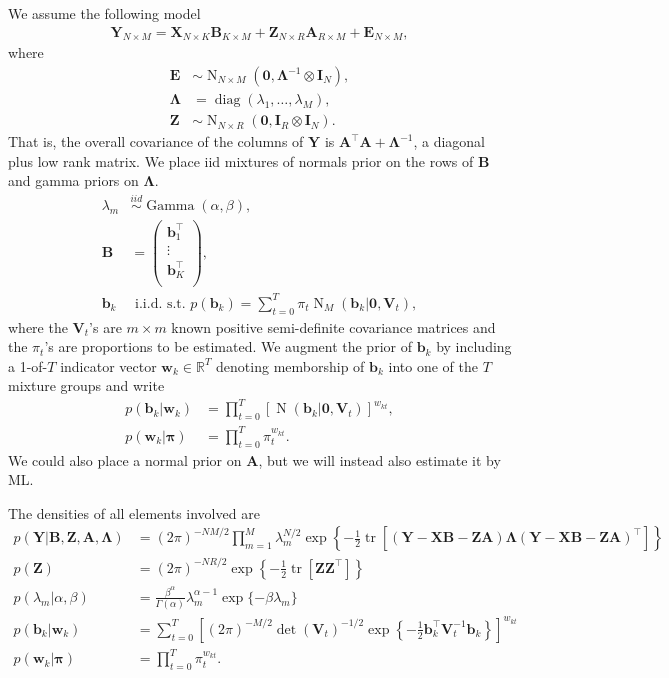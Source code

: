 \documentclass[11pt,authoryear]{article}
\DeclareMathOperator*{\diag}{diag}
\DeclareMathOperator*{\tr}{tr}
\DeclareMathOperator*{\N}{N}
\DeclareMathOperator*{\gm}{Gamma}
\newcommand{\bs}[1]{\boldsymbol{#1}}
\begin{document}
We assume the following model
\begin{align}
\bs{Y}_{N\times M} = \bs{X}_{N \times K}\bs{B}_{K \times M} + \bs{Z}_{N \times R}\bs{A}_{R \times M} + \bs{E}_{N \times M},
\end{align}
where
\begin{align}
\bs{E} &\sim \N_{N \times M}(\bs{0}, \bs{\Lambda}^{-1} \otimes \bs{I}_N),\\
\bs{\Lambda} &= \diag(\lambda_1,\ldots,\lambda_M),\\
\bs{Z} &\sim \N_{N\times R}(\bs{0}, \bs{I}_R \otimes \bs{I}_N).
\end{align}
That is, the overall covariance of the columns of $\bs{Y}$ is
$\bs{A}^{\intercal} \bs{A} + \bs{\Lambda}^{-1}$, a diagonal plus low
rank matrix. We place iid mixtures of normals prior on the rows of
$\bs{B}$ and gamma priors on $\bs{\Lambda}$.
\begin{align}
\lambda_m &\overset{iid}{\sim} \gm(\alpha, \beta),\\
\bs{B} &=
\left(
\begin{array}{c}
\bs{b}_1^\intercal\\
\vdots\\
\bs{b}_K^\intercal\\
\end{array}
\right),\\
\bs{b}_k &\text{ i.i.d. s.t. } p(\bs{b}_k) = \sum_{t = 0}^T\pi_t\N_M(\bs{b}_k | \bs{0}, \bs{V}_t),
\end{align}
where the $\bs{V}_t$'s are $m \times m$ known positive semi-definite
covariance matrices and the $\pi_t$'s are proportions to be
estimated. We augment the prior of $\bs{b}_k$ by including a 1-of-$T$
indicator vector $\bs{w}_k \in \mathbb{R}^{T}$ denoting memborship of
$\bs{b}_k$ into one of the $T$ mixture groups and write
\begin{align}
p(\bs{b}_k|\bs{w}_k) &= \prod_{t = 0}^T\left[\N(\bs{b}_k|\bs{0},\bs{V}_t)\right]^{w_{kt}},\\
p(\bs{w}_k|\bs{\pi}) &= \prod_{t = 0}^T \pi_t^{w_{kt}}.
\end{align}
We could also place a normal prior on $\bs{A}$, but we
will instead also estimate it by ML.

The densities of all elements involved are
\begin{align}
\label{equation:Y.conditional}p(\bs{Y}|\bs{B}, \bs{Z}, \bs{A}, \bs{\Lambda}) &= (2\pi)^{-NM/2} \prod_{m = 1}^M \lambda_m^{N/2} \exp\left\{-\frac{1}{2}\tr\left[(\bs{Y}-\bs{X}\bs{B}-\bs{Z}\bs{A})\bs{\Lambda}(\bs{Y}-\bs{X}\bs{B} - \bs{Z}\bs{A})^{\intercal}\right]\right\}\\
p(\bs{Z}) &= (2\pi)^{-NR/2}\exp\left\{-\frac{1}{2}\tr[\bs{Z}\bs{Z}^{\intercal}]\right\}  \\
p(\lambda_m|\alpha,\beta) &= \frac{\beta^{\alpha}}{\Gamma(\alpha)}\lambda_m^{\alpha - 1}\exp\{-\beta\lambda_m\}\\
p(\bs{b}_k|\bs{w}_k) &= \sum_{t = 0}^{T}\left[(2\pi)^{-M/2}\det(\bs{V}_t)^{-1/2}\exp\left\{-\frac{1}{2}\bs{b}_k^{\intercal}\bs{V}_t^{-1}\bs{b}_k\right\}\right]^{w_{kt}}\\
\label{equation:w.conditional}p(\bs{w}_k|\bs{\pi}) &= \prod_{t = 0}^{T} \pi_t^{w_{kt}}.
\end{align}
\end{document}
